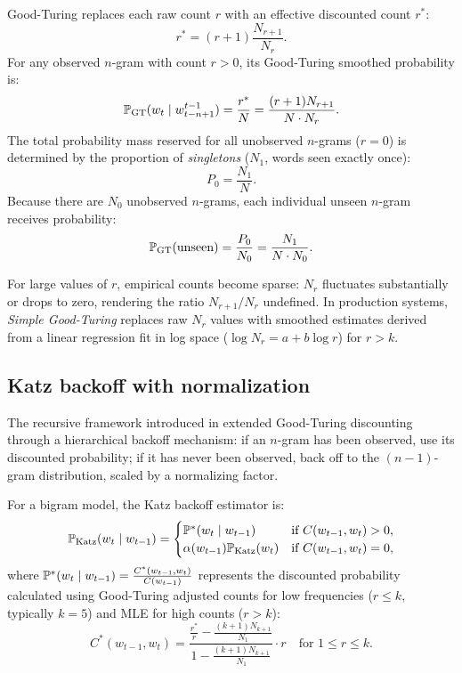 \documentclass[../../main.tex]{subfiles}
\begin{document}
Good-Turing replaces each raw count $r$ with an effective discounted count $r^*$:
\begin{equation}
\label{eq:good_turing_rstar}
r^* = (r + 1) \frac{N_{r+1}}{N_r}.
\end{equation}
For any observed $n$-gram with count $r > 0$, its Good-Turing smoothed probability is:
\begin{equation}
\label{eq:good_turing_prob}
\mathbb{P}_{\text{GT}}(w_t \mid w_{t-n+1}^{t-1}) = \frac{r^*}{N} = \frac{(r + 1) N_{r+1}}{N \cdot N_r}.
\end{equation}
The total probability mass reserved for all unobserved $n$-grams ($r = 0$) is determined by the proportion of \emph{singletons} ($N_1$, words seen exactly once):
\begin{equation}
\label{eq:good_turing_p0}
P_0 = \frac{N_1}{N}.
\end{equation}
Because there are $N_0$ unobserved $n$-grams, each individual unseen $n$-gram receives probability:
\begin{equation}
\label{eq:good_turing_unseen}
\mathbb{P}_{\text{GT}}(\text{unseen}) = \frac{P_0}{N_0} = \frac{N_1}{N \cdot N_0}.
\end{equation}

For large values of $r$, empirical counts become sparse: $N_r$ fluctuates substantially or drops to zero, rendering the ratio $N_{r+1}/N_r$ undefined. In production systems, \emph{Simple Good-Turing} \cite{manning1999} replaces raw $N_r$ values with smoothed estimates derived from a linear regression fit in log space ($\log N_r = a + b \log r$) for $r > k$.

\subsection{Katz backoff with normalization}
The recursive framework introduced in \cite{katz1987} extended Good-Turing discounting through a hierarchical backoff mechanism: if an $n$-gram has been observed, use its discounted probability; if it has never been observed, back off to the $(n-1)$-gram distribution, scaled by a normalizing factor.

For a bigram model, the Katz backoff estimator is:
\begin{equation}
\label{eq:katz_backoff}
\mathbb{P}_{\text{Katz}}(w_t \mid w_{t-1}) = \begin{cases}
\mathbb{P}^*(w_t \mid w_{t-1}) & \text{if } C(w_{t-1}, w_t) > 0, \\
\alpha(w_{t-1}) \mathbb{P}_{\text{Katz}}(w_t) & \text{if } C(w_{t-1}, w_t) = 0,
\end{cases}
\end{equation}
where $\mathbb{P}^*(w_t \mid w_{t-1}) = \frac{C^*(w_{t-1}, w_t)}{C(w_{t-1})}$ represents the discounted probability calculated using Good-Turing adjusted counts for low frequencies ($r \le k$, typically $k = 5$) and MLE for high counts ($r > k$):
\begin{equation}
\label{eq:katz_cstar}
C^*(w_{t-1}, w_t) = \frac{\frac{r^*}{r} - \frac{(k+1)N_{k+1}}{N_1}}{1 - \frac{(k+1)N_{k+1}}{N_1}} \cdot r \quad \text{for } 1 \le r \le k.
\end{equation}
\end{document}
